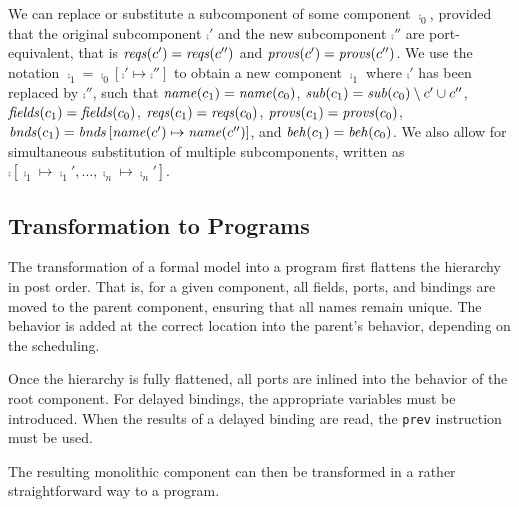 \documentclass[a4paper,10pt,english]{article}
\begin{document}
We can replace or substitute a subcomponent of some component $\comp_0$, provided that the original subcomponent $\comp'$ and the
new subcomponent $\comp''$ are port-equivalent, that is $\mathit{reqs}(c') = \mathit{reqs}(c'')$ and $\mathit{provs}(c') = \mathit{provs}(c'')$.
We use the notation $\comp_1 = \comp_0\left[\comp' \mapsto \comp''\right]$ to obtain a new component $\comp_1$ where $\comp'$ has
been replaced by $\comp''$, such that $\mathit{name}(c_1) = \mathit{name}(c_0)$, $\mathit{sub}(c_1) = \mathit{sub}(c_0) \setminus
c' \cup c''$, $\mathit{fields}(c_1)=\mathit{fields}(c_0)$, $\mathit{reqs}(c_1) = \mathit{reqs}(c_0)$, $\mathit{provs}(c_1) = \mathit{provs}(c_0)$,
$\mathit{bnds}(c_1) = \mathit{bnds}\left[\mathit{name}(c')\mapsto\mathit{name}(c'')\right]$, and $\mathit{beh}(c_1) =
\mathit{beh}(c_0)$. We also allow for simultaneous substitution of multiple subcomponents, written as
$\comp\left[\comp_1\mapsto\comp_1', \ldots, \comp_n\mapsto\comp_n'\right]$.

\subsection{Transformation to \Fil Programs}
The transformation of a formal model into a \Fil program first flattens the hierarchy in post order. That is, for a given
component, all fields, ports, and bindings are moved to the parent component, ensuring that all names remain unique. The behavior
is added at the correct location into the parent's behavior, depending on the scheduling. 

Once the hierarchy is fully flattened, all ports are inlined into the behavior of the root component. For delayed bindings, the
appropriate variables must be introduced. When the results of a delayed binding are read, the \texttt{prev} instruction must be used.

The resulting monolithic component can then be transformed in a rather straightforward way to a \Fil program.
\end{document}
